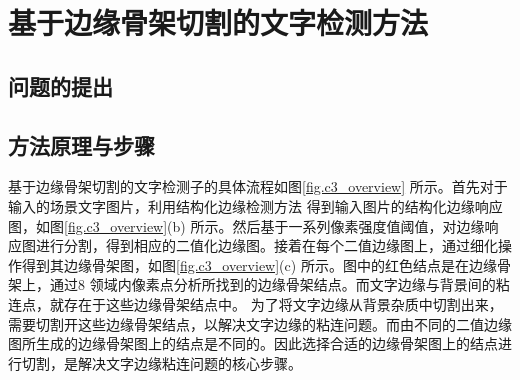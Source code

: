 ﻿%
%
%
%
%
%

\chapter{基于边缘骨架切割的文字检测方法}

    \section{问题的提出}

    \section{方法原理与步骤}

    基于边缘骨架切割的文字检测子的具体流程如图\ref{fig.c3_overview} 所示。首先对于输入的场景文字图片，利用结构化边缘检测方法\cite{Dollar2015Fast} 得到输入图片的结构化边缘响应图，如图\ref{fig.c3_overview}(b) 所示。然后基于一系列像素强度值阈值，对边缘响应图进行分割，得到相应的二值化边缘图。接着在每个二值边缘图上，通过细化操作得到其边缘骨架图，如图\ref{fig.c3_overview}(c) 所示。图中的红色结点是在边缘骨架上，通过8 领域内像素点分析所找到的边缘骨架结点。而文字边缘与背景间的粘连点，就存在于这些边缘骨架结点中。
    为了将文字边缘从背景杂质中切割出来，需要切割开这些边缘骨架结点，以解决文字边缘的粘连问题。而由不同的二值边缘图所生成的边缘骨架图上的结点是不同的。因此选择合适的边缘骨架图上的结点进行切割，是解决文字边缘粘连问题的核心步骤。


